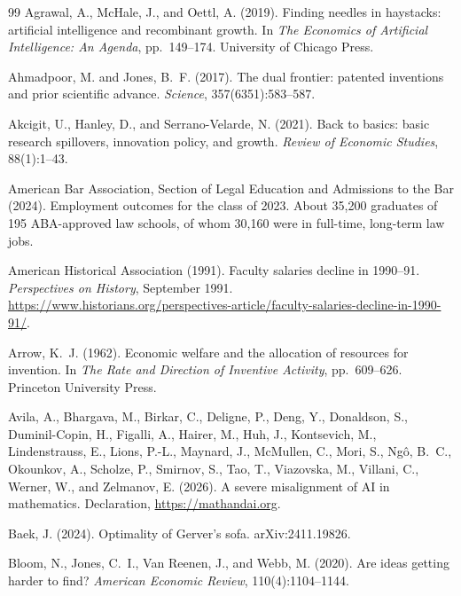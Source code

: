 \documentclass[11pt]{article}
\theoremstyle{definition}
\theoremstyle{remark}
\begin{document}
\begin{thebibliography}{99}
Agrawal, A., McHale, J., and Oettl, A. (2019).
\newblock Finding needles in haystacks: artificial intelligence and recombinant growth.
\newblock In \emph{The Economics of Artificial Intelligence: An Agenda}, pp.\ 149--174. University of Chicago Press.

Ahmadpoor, M. and Jones, B.~F. (2017).
\newblock The dual frontier: patented inventions and prior scientific advance.
\newblock \emph{Science}, 357(6351):583--587.

Akcigit, U., Hanley, D., and Serrano-Velarde, N. (2021).
\newblock Back to basics: basic research spillovers, innovation policy, and growth.
\newblock \emph{Review of Economic Studies}, 88(1):1--43.

American Bar Association, Section of Legal Education and Admissions to the Bar (2024).
\newblock Employment outcomes for the class of 2023.
\newblock About 35{,}200 graduates of 195 ABA-approved law schools, of whom 30{,}160 were in full-time, long-term law jobs.

American Historical Association (1991).
\newblock Faculty salaries decline in 1990--91.
\newblock \emph{Perspectives on History}, September 1991. \url{https://www.historians.org/perspectives-article/faculty-salaries-decline-in-1990-91/}.

Arrow, K.~J. (1962).
\newblock Economic welfare and the allocation of resources for invention.
\newblock In \emph{The Rate and Direction of Inventive Activity}, pp.\ 609--626. Princeton University Press.

Avila, A., Bhargava, M., Birkar, C., Deligne, P., Deng, Y., Donaldson, S., Duminil-Copin, H., Figalli, A., Hairer, M., Huh, J., Kontsevich, M., Lindenstrauss, E., Lions, P.-L., Maynard, J., McMullen, C., Mori, S., Ng\^o, B.~C., Okounkov, A., Scholze, P., Smirnov, S., Tao, T., Viazovska, M., Villani, C., Werner, W., and Zelmanov, E. (2026).
\newblock A severe misalignment of AI in mathematics.
\newblock Declaration, \url{https://mathandai.org}.

Baek, J. (2024).
\newblock Optimality of Gerver's sofa.
\newblock arXiv:2411.19826.

Bloom, N., Jones, C.~I., Van Reenen, J., and Webb, M. (2020).
\newblock Are ideas getting harder to find?
\newblock \emph{American Economic Review}, 110(4):1104--1144.


\end{thebibliography}
\end{document}
